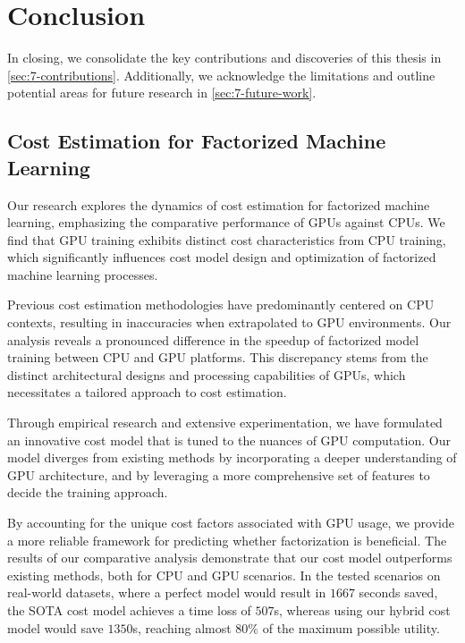 
\chapter{Conclusion}

\label{chapter:conclusion}
In closing, we consolidate the key contributions and discoveries of this thesis in \autoref{sec:7-contributions}. Additionally, we acknowledge the limitations and outline potential areas for future research in \autoref{sec:7-future-work}.

\section{Cost Estimation for Factorized Machine Learning}
\label{sec:7-contributions}
Our research explores the dynamics of cost estimation for factorized machine learning, emphasizing the comparative performance of GPUs against CPUs. We find that GPU training exhibits distinct cost characteristics from CPU training, which significantly influences cost model design and optimization of factorized machine learning processes.

Previous cost estimation methodologies have predominantly centered on CPU contexts, resulting in inaccuracies when extrapolated to GPU environments. Our analysis reveals a pronounced difference in the speedup of factorized model training between CPU and GPU platforms. This discrepancy stems from the distinct architectural designs and processing capabilities of GPUs, which necessitates a tailored approach to cost estimation.

Through empirical research and extensive experimentation, we have formulated an innovative cost model that is tuned to the nuances of GPU computation. Our model diverges from existing methods by incorporating a deeper understanding of GPU architecture, and by leveraging a more comprehensive set of features to decide the training approach.

By accounting for the unique cost factors associated with GPU usage, we provide a more reliable framework for predicting whether factorization is beneficial. The results of our comparative analysis demonstrate that our cost model outperforms existing methods, both for CPU and GPU scenarios. In the tested scenarios on real-world datasets, where a perfect model would result in $1667$ seconds saved, the SOTA cost model achieves a time loss of $507$s, whereas using our hybrid cost model would save $1350$s, reaching almost $80\%$ of the maximum possible utility.

